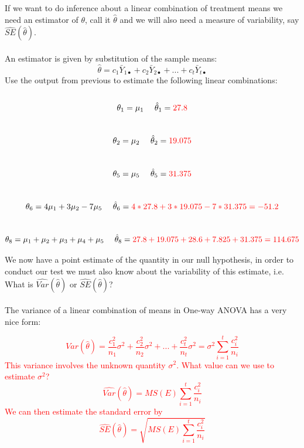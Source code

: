 If we want to do inference about a linear combination of treatment means we need an estimator of $\theta$, call it $\hat{\theta}$ and we will also need a measure of variability, say $\hat{SE}(\hat{\theta})$.\\~\\
An estimator is given by substitution of the sample means: 
    $$\hat{\theta}=c_{1}\bar{Y}_{1\bullet}+c_{2}\bar{Y}_{2\bullet}+...+c_{t}\bar{Y}_{t\bullet}$$
 Use the output from previous to estimate the following linear combinations:  \\~\\
    $$\theta_1=\mu_1~~~~\hat{\theta}_1=%
		\textcolor{red}{27.8}$$~\\
    $$\theta_2=\mu_2~~~~\hat{\theta}_2=%
		\textcolor{red}{19.075}$$~\\
    $$\theta_5=\mu_5~~~~\hat{\theta}_5=%
		\textcolor{red}{31.375}$$~\\
    $$\theta_6=4\mu_{1}+3\mu_{2}-7\mu_{5}~~~~\hat{\theta}_6=%
		\textcolor{red}{4*27.8+3*19.075-7*31.375=-51.2}$$~\\
    $$\theta_8=\mu_{1}+\mu_{2}+\mu_{3}+\mu_{4}+\mu_{5}~~~~\hat{\theta}_8=%
		\textcolor{red}{27.8+19.075+28.6+7.825+31.375=114.675}$$

We now have a point estimate of the quantity in our null hypothesis, in order to conduct our test we must also know about the variability of this estimate, i.e. What is $\hat{Var}(\hat{\theta})$ or $\hat{SE}(\hat{\theta})$?\\~\\
The variance of a linear combination of means in One-way ANOVA has a very nice form:

\textcolor{red}{
$$Var(\hat{\theta})=\frac{c_{1}^{2}}{n_{1}}\sigma^2+\frac{c_{2}^{2}}{n_{2}}\sigma^2+...+\frac{c_{t}^{2}}{n_{t}}\sigma^2=\sigma^{2}\sum_{i=1}^{t}\frac{c_{i}^2}{n_{i}}$$
This variance involves the unknown quantity $\sigma^2$.  What value can we use to estimate $\sigma^2$?
$$\hat{Var}(\hat{\theta})=MS(E)\sum_{i=1}^{t}\frac{c_{i}^2}{n_{i}}$$
We can then estimate the standard error by
$$\hat{SE}(\hat{\theta})=\sqrt{MS(E)\sum_{i=1}^{t}\frac{c_{i}^2}{n_{i}}}$$}
\newpage



